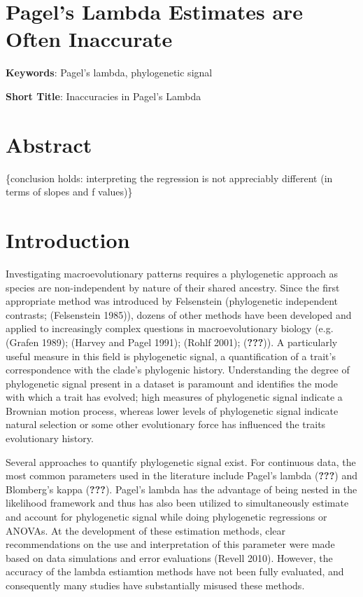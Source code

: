 \documentclass[]{article}
\date{}
\begin{document}
\section{Pagel's Lambda Estimates are Often
Inaccurate}\label{pagels-lambda-estimates-are-often-inaccurate}

\hfill\break

\textbf{Keywords}: Pagel's lambda, phylogenetic signal \hfill\break

\textbf{Short Title}: Inaccuracies in Pagel's Lambda \hfill\break

\section{Abstract}\label{abstract}

\{conclusion holds: interpreting the regression is not appreciably
different (in terms of slopes and f values)\}

\newpage

\section{Introduction}\label{introduction}

Investigating macroevolutionary patterns requires a phylogenetic
approach as species are non-independent by nature of their shared
ancestry. Since the first appropriate method was introduced by
Felsenstein (phylogenetic independent contrasts; (Felsenstein 1985)),
dozens of other methods have been developed and applied to increasingly
complex questions in macroevolutionary biology (e.g. (Grafen 1989);
(Harvey and Pagel 1991); (Rohlf 2001); ({\textbf{???}})). A particularly
useful measure in this field is phylogenetic signal, a quantification of
a trait's correspondence with the clade's phylogenic history.
Understanding the degree of phylogenetic signal present in a dataset is
paramount and identifies the mode with which a trait has evolved; high
measures of phylogenetic signal indicate a Brownian motion process,
whereas lower levels of phylogenetic signal indicate natural selection
or some other evolutionary force has influenced the traits evolutionary
history. \hfill\break

Several approaches to quantify phylogenetic signal exist. For continuous
data, the most common parameters used in the literature include Pagel's
lambda ({\textbf{???}}) and Blomberg's kappa ({\textbf{???}}). Pagel's
lambda has the advantage of being nested in the likelihood framework and
thus has also been utilized to simultaneously estimate and account for
phylogenetic signal while doing phylogenetic regressions or ANOVAs. At
the development of these estimation methods, clear recommendations on
the use and interpretation of this parameter were made based on data
simulations and error evaluations (Revell 2010). However, the accuracy
of the lambda estiamtion methods have not been fully evaluated, and
consequently many studies have substantially misused these methods.
\hfill\break
\end{document}
